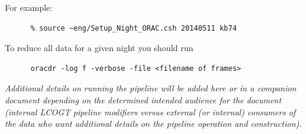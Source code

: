 \documentclass[twoside,11pt]{article}
\newcommand{\xref}[3]{#1}
\renewcommand{\_}{\texttt{\symbol{95}}}
\newcommand{\GAIA}{\xref{{\sc{Gaia}}}{sun214}{}}
\newcommand{\KAPPA}{\xref{{\sc{Kappa}}}{sun95}{}}
\newcommand{\ORACDR}{{\footnotesize ORAC-DR}}
\begin{document}
For example:

\begin{verbatim}
      % source ~eng/Setup_Night_ORAC.csh 20140511 kb74
\end{verbatim}

To reduce all data for a given night you should run 

\begin{verbatim}
      oracdr -log f -verbose -file <filename of frames>
\end{verbatim}

\textit{Additional details on running the pipeline will be added here or in a companion
document depending on the determined intended audience for the document
(internal LCOGT pipeline modifiers versus external (or internal) consumers of
the data who want additional details on the pipeline operation and
construction).}

%
%
%
%
%
%
%
%
%
\end{document}
